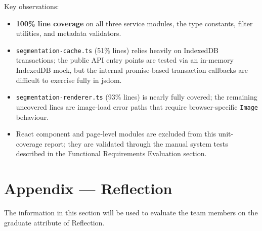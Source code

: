 \documentclass[12pt, titlepage]{article}
\begin{document}
Key observations:
\begin{itemize}
  \item \textbf{100\% line coverage} on all three service modules, the type
        constants, filter utilities, and metadata validators.
  \item \texttt{segmentation-cache.ts} (51\% lines) relies heavily on IndexedDB
        transactions; the public API entry points are tested via an in-memory
        IndexedDB mock, but the internal promise-based transaction callbacks are
        difficult to exercise fully in jsdom.
  \item \texttt{segmentation-renderer.ts} (93\% lines) is nearly fully covered;
        the remaining uncovered lines are image-load error paths that require
        browser-specific \texttt{Image} behaviour.
  \item React component and page-level modules are excluded from this
        unit-coverage report; they are validated through the manual system tests
        described in the Functional Requirements Evaluation section.
\end{itemize}

\FloatBarrier


\FloatBarrier
\clearpage
\newpage{}
\section*{Appendix --- Reflection}

The information in this section will be used to evaluate the team members on the
graduate attribute of Reflection.


\end{document}
